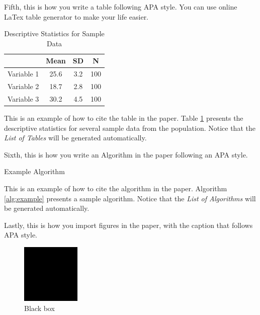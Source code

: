     Fifth, this is how you write a table following APA style. You can use online LaTex table generator to make your life easier.
        \begin{table}[ht]
            \caption{Descriptive Statistics for Sample Data}
            \label{tab:descriptive_stats}
            \centering
            \begin{tabular}{lccc}
                \hline
                & \textbf{Mean} & \textbf{SD} & \textbf{N} \\
                \hline
                Variable 1 & 25.6 & 3.2 & 100 \\
                Variable 2 & 18.7 & 2.8 & 100 \\
                Variable 3 & 30.2 & 4.5 & 100 \\
                \hline
            \end{tabular}
        \end{table}

    This is an example of how to cite the table in the paper. Table \ref{tab:descriptive_stats} presents the descriptive statistics for several sample data from the population. Notice that the \textit{List of Tables} will be generated automatically.


    Sixth, this is how you write an Algorithm in the paper following an APA style. 
        \begin{algorithm}[ht]
            \caption{Example Algorithm}
            \label{alg:example}
            
        \end{algorithm}

    This is an example of how to cite the algorithm in the paper. Algorithm \ref{alg:example} presents a sample algorithm. Notice that the \textit{List of Algorithms} will be generated automatically.


    Lastly, this is how you import figures in the paper, with the caption that follows APA style.
        \begin{figure}[ht]
        	\centering
        	\includegraphics[scale = 0.70]{images/blackbox.png}
            \caption{
        			Black box
        	}
            \label{fig:blackbox}
        \end{figure}

